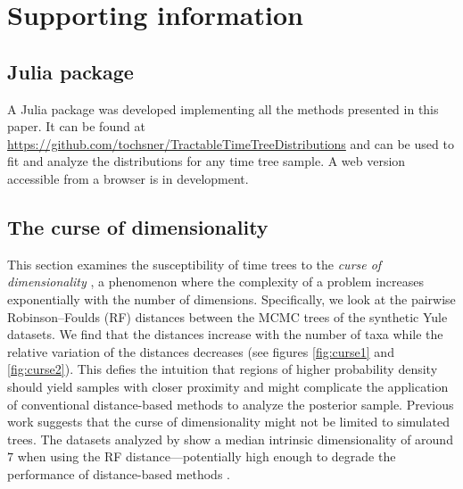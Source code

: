 \documentclass[10pt,letterpaper]{article}
\begin{document}
\section*{Supporting information}

\subsection*{Julia package}

A Julia package \cite{juliapackage} was developed implementing all the methods presented in this paper. It can be found at \url{https://github.com/tochsner/TractableTimeTreeDistributions} and can be used to fit and analyze the distributions for any time tree sample. A web version accessible from a browser is in development.

\subsection*{The curse of dimensionality}

This section examines the susceptibility of time trees to the \emph{curse of dimensionality} \cite{curse,curse2}, a phenomenon where the complexity of a problem increases exponentially with the number of dimensions. Specifically, we look at the pairwise Robinson–Foulds (RF) distances between the MCMC trees of the synthetic Yule datasets. We find that the distances increase with the number of taxa while the relative variation of the distances decreases (see figures \ref{fig:curse1} and \ref{fig:curse2}). This defies the intuition that regions of higher probability density should yield samples with closer proximity and might complicate the application of conventional distance-based methods to analyze the posterior sample. Previous work suggests that the curse of dimensionality might not be limited to simulated trees. The datasets analyzed by \cite{dimensionality} show a median intrinsic dimensionality of around $7$ when using the RF distance---potentially high enough to degrade the performance of distance-based methods \cite{curseimplications}.
\end{document}
